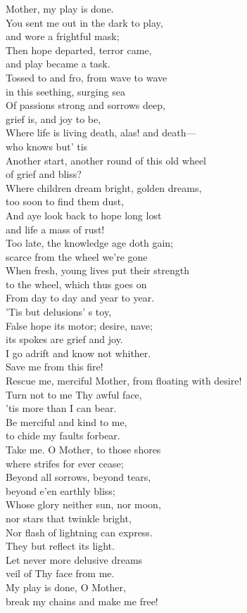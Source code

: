 \begin{myquote}
{Mother, my play is done.\\
You sent me out in the dark to play,\\
and wore a frightful mask;\\
Then hope departed, terror came,\\
and play became a task.\\
Tossed to and fro, from wave to wave\\
in this seething, surging sea\\
Of passions strong and sorrows deep,\\
grief is, and joy to be,\\
Where life is living death, alas! and death—\\
who knows but’ tis\\
Another start, another round of this old wheel\\
of grief and bliss?\\
Where children dream bright, golden dreams,\\
too soon to find them dust,\\
And aye look back to hope long lost\\
and life a mass of rust!\\
Too late, the knowledge age doth gain;\\
scarce from the wheel we’re gone\\
When fresh, young lives put their strength\\
to the wheel, which thus goes on\\
From day to day and year to year.\\
’Tis but delusions’ s toy,\\
False hope its motor; desire, nave;\\
its spokes are grief and joy.\\
I go adrift and know not whither.\\
Save me from this fire!\\
Rescue me, merciful Mother, from floating with desire!\\
Turn not to me Thy awful face,\\
’tis more than I can bear.\\
Be merciful and kind to me,\\
to chide my faults forbear.\\
Take me. O Mother, to those shores\\
where strifes for ever cease;\\
Beyond all sorrows, beyond tears,\\
beyond e’en earthly bliss;\\
Whose glory neither sun, nor moon,\\
nor stars that twinkle bright,\\
Nor flash of lightning can express.\\
They but reflect its light.\\
Let never more delusive dreams\\
veil of Thy face from me.\\
My play is done, O Mother,\\
break my chains and make me free!}
\end{myquote}


